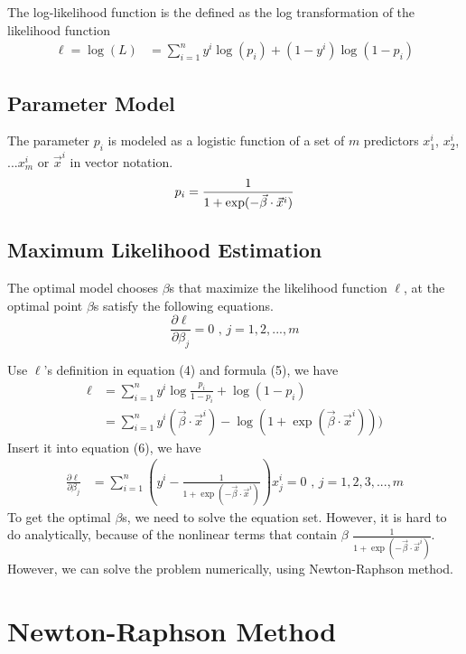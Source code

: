 \documentclass[12pt, oneside]{article}
\begin{document}
The log-likelihood function is the defined as the log transformation of the likelihood function
\begin{align}
\ell=\log(L)&={\sum_{i=1}^{n}y^i\log(p_i)+(1-y^i)\log(1-p_i)}
\end{align}

\subsection{Parameter Model}
The parameter $p_i$ is modeled as a logistic function of a set of $m$ predictors $x_1^i$, $x_2^i$, ...$x_m^i$ or $\vec{x}^i$ in vector notation.
\begin{equation}
\mathnormal{p_i}=\frac{1}{1+\mathnormal{\exp(-\vec{\beta}\cdot\vec{x}^i)}}
\end{equation}

\subsection{Maximum Likelihood Estimation}
The optimal model chooses $\beta$s that maximize the likelihood function $\ell$, at the optimal point $\beta$s satisfy the following equations.
\begin{equation}
\frac{\partial \ell}{\partial \beta_j}=0 \text{ , }j = 1, 2, ..., m
\end{equation}

Use $\ell$'s definition in equation (4) and formula (5), we have 
\begin{align*}
{\ell}&=\sum_{i=1}^{n}y^i\log\frac{p_i}{1-p_i}+\log(1-p_i)\\
&=\sum_{i=1}^{n}y^i(\vec{\beta}\cdot\vec{x}^i)-\log(1+\exp(\vec{\beta}\cdot\vec{x}^i)))
\end{align*}
Insert it into equation (6), we have
\begin{align*}
{\frac{\partial\ell}{\partial\beta_j}}
&={\sum_{i=1}^{n}\left (y^i-\frac{1}{1+\exp(-\vec{\beta}\cdot\vec{x}^i)} \right) x_{j}^{i}}=0 \text{ , } {j=1, 2, 3, ...,m}
\end{align*}
To get the optimal $\beta$s, we need to solve the equation set. However, it is hard to do analytically, because of the nonlinear terms that contain 
$\beta$ $\frac{1}{1+\exp(-\vec{\beta}\cdot\vec{x}^i)}$. However, we can solve the problem numerically, using Newton-Raphson method.

\section{Newton-Raphson Method}
\end{document}
